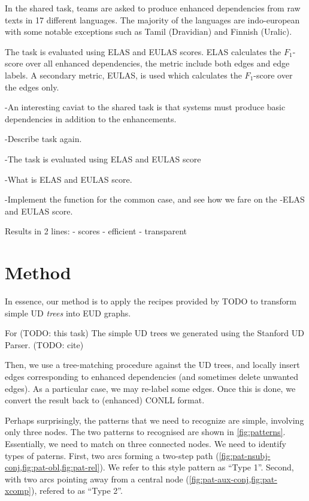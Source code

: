 \documentclass[11pt,a4paper]{article}
\begin{document}
In the shared task, teams are asked to produce enhanced
dependencies from raw texts in 17 different languages. The
majority of the languages are indo-european with some notable
exceptions such as Tamil (Dravidian) and Finnish (Uralic).

The task is evaluated using ELAS and EULAS scores. ELAS calculates
the $F_1$-score over all enhanced dependencies, the metric
include both edges and edge labels. A secondary metric, EULAS, is
used which calculates the $F_1$-score over the edges only.


    
-An interesting caviat to the shared task is that systems must produce basic dependencies in addition to the enhancements.  
    
-Describe task again.

-The task is evaluated using ELAS and EULAS score

    
-What is ELAS and EULAS  score.

-Implement the function for the common case, and see how we fare on the
-ELAS and EULAS  score.

Results in 2 lines:
- scores
- efficient
- transparent

\section{Method}


In essence, our method is to apply the recipes provided by TODO to
transform simple UD \emph{trees} into EUD graphs.

For (TODO: this task) The simple UD trees we generated using the
Stanford UD Parser. (TODO: cite)

Then, we use a tree-matching procedure against the UD trees, and
locally insert edges corresponding to enhanced dependencies (and
sometimes delete unwanted edges). As a particular case, we may
re-label some edges. Once this is done, we convert the result back to
(enhanced) CONLL  format.

Perhaps surprisingly, the patterns that we need to recognize are
simple, involving only three nodes. The two patterns to recognised are
shown in \cref{fig:patterns}. Essentially, we need to match on three
connected nodes.  We need to identify types of paterns. First, two
arcs forming a two-step path
(\cref{fig:pat-nsubj-conj,fig:pat-obl,fig:pat-rel}). We refer to this
style pattern as ``Type 1''.  Second, with two arcs pointing away from
a central node (\cref{fig:pat-aux-conj,fig:pat-xcomp}), refered to as
``Type 2''.
\end{document}
